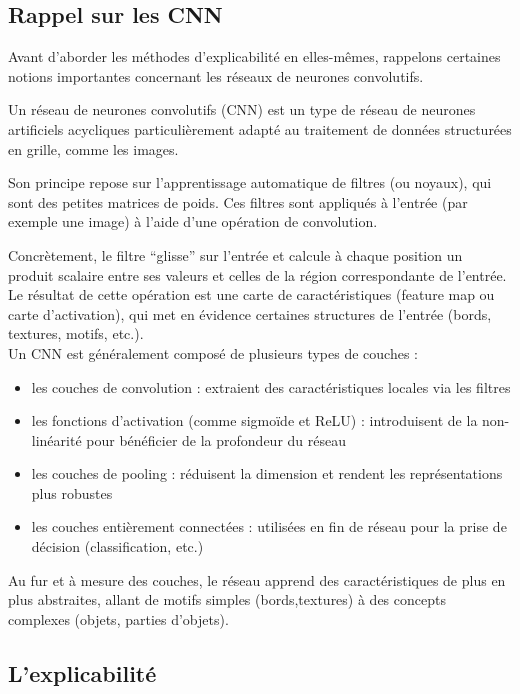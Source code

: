 \documentclass{ir}
\begin{document}
\subsection{Rappel sur les CNN}\label{subsec:rappel}

Avant d'aborder les méthodes d'explicabilité en elles-mêmes, rappelons certaines notions importantes concernant les réseaux de neurones convolutifs.

Un réseau de neurones convolutifs (CNN) est un type de réseau de neurones artificiels acycliques particulièrement adapté au traitement de données structurées en grille, comme les images.

Son principe repose sur l'apprentissage automatique de filtres (ou noyaux), qui sont des petites matrices de poids.
Ces filtres sont appliqués à l'entrée (par exemple une image) à l'aide d'une opération de convolution.

Concrètement, le filtre “glisse” sur l'entrée et calcule à chaque position un produit scalaire entre ses valeurs et celles de la région correspondante de l'entrée.
Le résultat de cette opération est une carte de caractéristiques (feature map ou carte d'activation), qui met en évidence certaines structures de l'entrée (bords, textures, motifs, etc.).\\

Un CNN est généralement composé de plusieurs types de couches :
\begin{itemize}
    \item les couches de convolution : extraient des caractéristiques locales via les filtres
    \item les fonctions d'activation (comme sigmoïde et ReLU) : introduisent de la non-linéarité pour bénéficier de la profondeur du réseau
    \item les couches de pooling : réduisent la dimension et rendent les représentations plus robustes
    \item les couches entièrement connectées : utilisées en fin de réseau pour la prise de décision (classification, etc.)
\end{itemize}
Au fur et à mesure des couches, le réseau apprend des caractéristiques de plus en plus abstraites, allant de motifs simples (bords,textures) à des concepts complexes (objets, parties d'objets).

\subsection{L'explicabilité}
\end{document}
